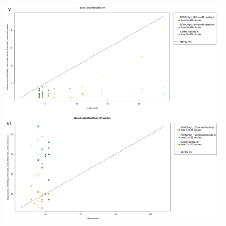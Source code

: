 \begin{figure}[h!]
\begin{center}
\includegraphics[width=15cm,height=16cm]{ApoLowCountScootsN.png}
\end{center}
\end{figure}



